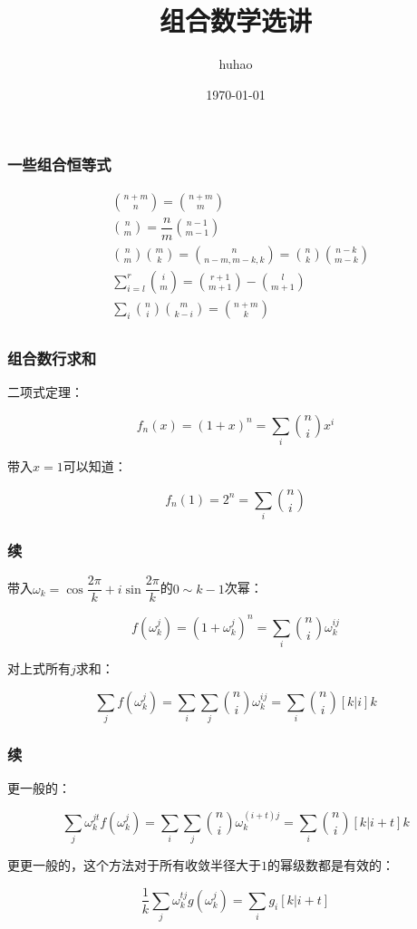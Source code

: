 \documentclass[10pt]{beamer}
\begin{document}
	\title{组合数学选讲}
	\date{\today}
	\author{huhao}
	\maketitle
	\clearpage
	\begin{frame}
		\frametitle{一些组合恒等式}

		$$
		\begin{aligned}
			&{n+m\choose n}={n+m\choose m}\\
			&{n\choose m}=\dfrac nm{n-1\choose m-1}\\
			&{n\choose m}{m\choose k}={n\choose n-m,m-k,k}={n\choose k}{n-k\choose m-k}\\
			&\sum_{i=l}^r{i\choose m}={r+1\choose m+1}-{l\choose m+1}\\
			&\sum_{i}{n\choose i}{m\choose k-i}={n+m\choose k}\\
		\end{aligned}
		$$

	\end{frame}
	\begin{frame}
		\frametitle{组合数行求和}

		二项式定理：

		$$
		f_n(x)=(1+x)^n=\sum_i {n\choose i}x^i
		$$
		
		带入$x=1$可以知道：

		$$
		f_n(1)=2^n=\sum_i{n\choose i}
		$$

	\end{frame}
	\begin{frame}
		\frametitle{续}
	
		带入$\omega_k=\cos \dfrac{2\pi}{k}+i\sin \dfrac{2\pi}{k}$的$0\sim k-1$次幂：

		$$
		f(\omega_k^j)=(1+\omega_k^j)^n=\sum_i {n\choose i}\omega_k^{ij}
		$$

		对上式所有$j$求和：

		$$
		\sum_j f(\omega_k^j)=\sum_{i}\sum_j{n\choose i}\omega_k^{ij}=\sum_i {n\choose i}[k|i]k
		$$
	
	\end{frame}
	\begin{frame}
		\frametitle{续}
	
		更一般的：

		$$
		\sum_j \omega_k^{jt}f(\omega_k^j)=\sum_{i}\sum_j{n\choose i}\omega_k^{(i+t)j}=\sum_i {n\choose i}[k|i+t]k
		$$

		更更一般的，这个方法对于所有收敛半径大于$1$的幂级数都是有效的：

		$$
		\dfrac 1k\sum_j \omega_k^{tj}g(\omega_k^j)=\sum_{i}g_i[k|i+t]
		$$
	
	\end{frame}
\end{document}
